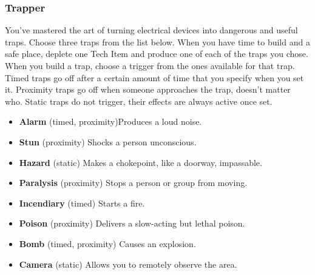 \subsubsection{Trapper}
You've mastered the art of turning electrical devices into dangerous and useful traps.
Choose three traps from the list below. When you have time to build and a safe place,
deplete one Tech Item and produce one of each of the traps you chose. When you
build a trap, choose a trigger from the ones available for that trap. Timed traps go off
after a certain amount of time that you specify when you set it. Proximity traps go off
when someone approaches the trap, doesn't matter who. Static traps do not trigger,
their effects are always active once set.
\begin{itemize}
\item \textbf{Alarm} (timed, proximity)\hfill Produces a loud noise.
\item \textbf{Stun} (proximity) \hfill Shocks a person unconscious.
\item \textbf{Hazard} (static) \hfill Makes a chokepoint, like a doorway, impassable.
\item \textbf{Paralysis} (proximity) \hfill Stops a person or group from moving.
\item \textbf{Incendiary} (timed) \hfill Starts a fire.
\item \textbf{Poison} (proximity) \hfill Delivers a slow-acting but lethal poison.
\item \textbf{Bomb} (timed, proximity) \hfill Causes an explosion.
\item \textbf{Camera} (static) \hfill Allows you to remotely observe the area.
\end{itemize}





